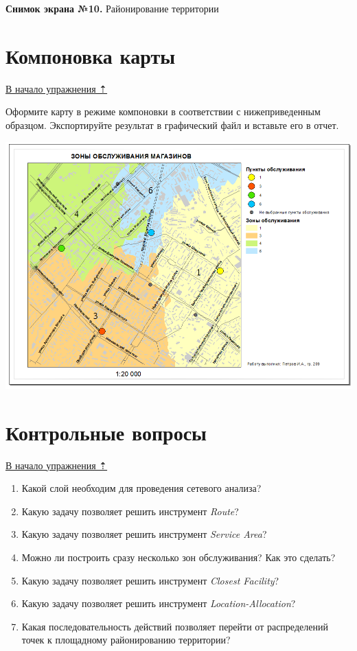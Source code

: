 \documentclass[12pt,]{book}
\begin{document}
\textbf{Снимок экрана №10.} Районирование территории

\hypertarget{network-analysis-layout}{%
\section{Компоновка карты}\label{network-analysis-layout}}

\protect\hyperlink{network-analysis}{В начало упражнения ⇡}

Оформите карту в режиме компоновки в соответствии с нижеприведенным образцом. Экспортируйте результат в графический файл и вставьте его в отчет.

\includegraphics{images/Ex12/image36.png}

\hypertarget{network-analysis-questions}{%
\section{Контрольные вопросы}\label{network-analysis-questions}}

\protect\hyperlink{network-analysis}{В начало упражнения ⇡}

\begin{enumerate}
\def\labelenumi{\arabic{enumi}.}
\item
  Какой слой необходим для проведения сетевого анализа?
\item
  Какую задачу позволяет решить инструмент \emph{Route}?
\item
  Какую задачу позволяет решить инструмент \emph{Service Area}?
\item
  Можно ли построить сразу несколько зон обслуживания? Как это сделать?
\item
  Какую задачу позволяет решить инструмент \emph{Closest Facility}?
\item
  Какую задачу позволяет решить инструмент \emph{Location-Allocation}?
\item
  Какая последовательность действий позволяет перейти от распределений точек к площадному районированию территории?
\end{enumerate}
\end{document}
